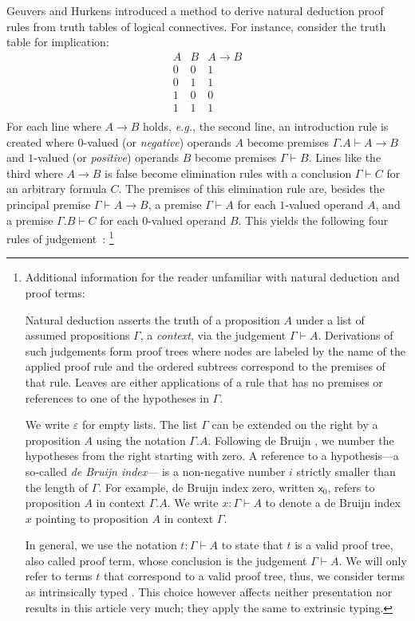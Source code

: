 \documentclass[a4paper,USenglish,cleveref, autoref, thm-restate]{lipics-v2021}
\newcommand{\eg}{\emph{e.g.}\xspace}
\newcommand{\Ge}{\ensuremath{\varepsilon}}
\newcommand{\x}{\mathsf{x}}
\begin{document}
Geuvers and Hurkens \cite{geuversHurkens:icla17} introduced a method to derive natural
deduction proof rules from truth tables of logical connectives.
For instance, consider the truth table for implication:
\[
\begin{array}{cc|c}
  A & B & A \to B \\
\hline
  0 & 0 & 1 \\
  0 & 1 & 1 \\
  1 & 0 & 0 \\
  1 & 1 & 1 \\
\end{array}
\]
For each line where $A \to B$ holds, \eg, the second line, an
introduction rule is created where $0$-valued (or \emph{negative})
operands $A$ become premises $\Gamma.A \vdash A \to B$ and $1$-valued
(or \emph{positive}) operands $B$ become premises $\Gamma \vdash B$.
Lines like the third where $A \to B$ is false become elimination rules
with a conclusion $\Gamma \vdash C$ for an arbitrary formula $C$.
The premises of this elimination rule are,
besides the principal premise $\Gamma \vdash A \to B$,
a premise $\Gamma \vdash A$ for each $1$-valued operand $A$, and
a premise $\Gamma.B \vdash C$ for each $0$-valued operand $B$.
This yields the following four rules of judgement
\,:%
%
\footnote{%
Additional information for the reader unfamiliar with natural deduction and proof terms:
\par
Natural deduction asserts the truth of a proposition $A$
  under a list of assumed propositions $\Gamma$, a \emph{context}, via the
  judgement $\Gamma \vdash A$.  Derivations of such judgements
  form proof trees where nodes are labeled by the name of
  the applied proof rule and the ordered subtrees correspond to the premises
  of that rule.  Leaves are either applications of a rule that has no
  premises or references to one of the hypotheses in $\Gamma$.
\par
  We write $\Ge$ for empty lists.
  The list $\Gamma$ can be extended on the right by a proposition $A$
  using the notation $\Gamma.A$.  Following de Bruijn
  \cite{deBruijn:nameless}, we number the hypotheses from the right
  starting with zero.
  A reference to a hypothesis---a so-called \emph{de Bruijn index}---
  is a
  non-negative number $i$ strictly smaller than the length of $\Gamma$.
  For example, de Bruijn index zero, written $\x_0$,
  refers to proposition $A$ in context $\Gamma.A$.  We write $x :
  \Gamma \vdash A$ to denote a de Bruijn index $x$ pointing to
  proposition $A$ in context $\Gamma$.
\par
  In general, we use the notation $t : \Gamma \vdash A$ to state that
  $t$ is a valid proof tree, also called proof term, whose conclusion
  is the judgement $\Gamma \vdash A$.  We will only refer to terms $t$
  that correspond to a valid proof tree, thus, we consider terms as
  intrinsically typed
  \cite{alti:monadic,bentonHurKennedyMcBride:jar12}.  This choice
  however affects neither presentation nor results in this article
  very much; they apply the same to extrinsic typing.
%
}%
\end{document}
